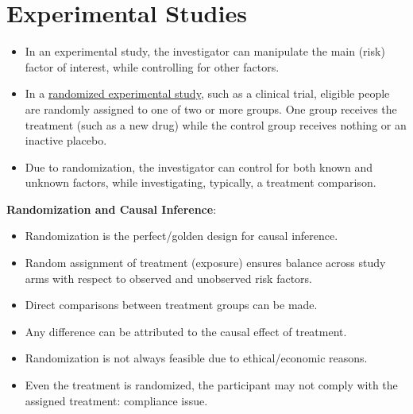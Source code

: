 \section{Experimental Studies}
\begin{itemize}
    \item In an experimental study, the investigator can manipulate the
          main (risk) factor of interest, while controlling for other
          factors.
    \item In a \underline{randomized experimental study}, such as a clinical trial,
          eligible people are randomly assigned to one of two or more
          groups. One group receives the treatment (such as a new
          drug) while the control group receives nothing or an inactive
          placebo.
    \item Due to randomization, the investigator can control for both
          known and unknown factors, while investigating, typically, a
          treatment comparison.
\end{itemize}
\textbf{Randomization and Causal Inference}:
\begin{itemize}
    \item Randomization is the perfect/golden design for causal
          inference.
    \item Random assignment of treatment (exposure) ensures balance
          across study arms with respect to observed and unobserved
          risk factors.
    \item Direct comparisons between treatment groups can be made.
    \item Any difference can be attributed to the causal effect of
          treatment.
    \item Randomization is not always feasible due to ethical/economic
          reasons.
    \item Even the treatment is randomized, the participant may not
          comply with the assigned treatment: compliance issue.
\end{itemize}

